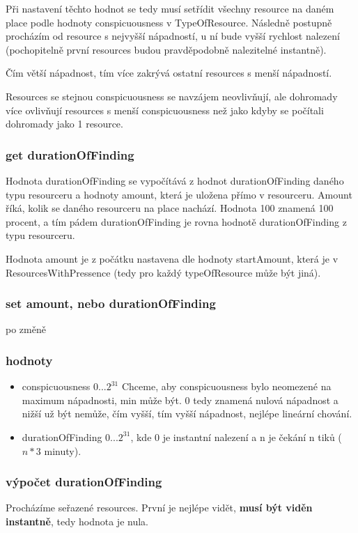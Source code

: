 \documentclass[12pt,a4paper]{report}
\begin{document}
Při nastavení těchto hodnot se tedy musí setřídit všechny resource na daném place podle hodnoty conspicuousness v TypeOfResource. Následně postupně procházím od resource s nejvyšší nápadností, u ní bude vyšší rychlost nalezení (pochopitelně první resources budou pravděpodobně nalezitelné instantně). 

Čím větší nápadnost, tím více zakrývá ostatní resources s menší nápadností.

Resources se stejnou conspicuousness se navzájem neovlivňují, ale dohromady více ovlivňují resources s menší conspicuousness než jako kdyby se počítali dohromady jako 1 resource.

\subsubsection{get durationOfFinding} 
Hodnota durationOfFinding se vypočítává z hodnot durationOfFinding daného typu resourceru a hodnoty amount, která je uložena přímo v resourceru. Amount říká, kolik se daného resourceru na place nachází. Hodnota 100 znamená 100 procent, a tím pádem durationOfFinding je rovna hodnotě durationOfFinding z typu resourceru.

Hodnota amount je z počátku nastavena dle hodnoty startAmount, která je v ResourcesWithPressence (tedy pro každý typeOfResource může být jiná).

\subsubsection{set amount, nebo durationOfFinding}   
po změně

\subsubsection{hodnoty}

\begin{itemize}
\item{conspicuousness} $0 ... 2^{31}$ Chceme, aby conspicuousness bylo neomezené na maximum nápadnosti, min může být. 0 tedy znamená nulová nápadnost a nižší už být nemůže, čím vyšší, tím vyšší nápadnost, nejlépe lineární chování.

\item{durationOfFinding}
$0...2^{31}$, kde 0 je instantní nalezení a n je čekání n tiků ($n * 3$ minuty).
\end{itemize}

\subsubsection{výpočet durationOfFinding}
Procházíme seřazené resources. První je nejlépe vidět, \textbf{musí být viděn instantně}, tedy hodnota je nula.
\end{document}
